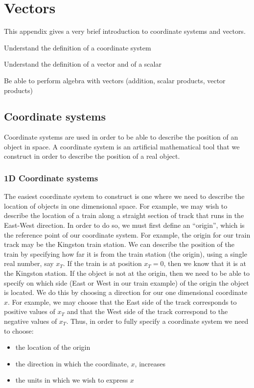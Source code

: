 \chapter{Vectors}
\label{app:vectors}
This appendix gives a very brief introduction to coordinate systems and vectors.
 \vspace{1cm}
\begin{learningObjectives}
\item Understand the definition of a coordinate system
\item Understand the definition of a vector and of a scalar
\item Be able to perform algebra with vectors (addition, scalar products, vector products)
\end{learningObjectives}

\section{Coordinate systems}
Coordinate systems are used in order to be able to describe the position of an object in space. A coordinate system is an artificial mathematical tool that we construct in order to describe the position of a real object. 

\subsection{1D Coordinate systems} 
The easiest coordinate system to construct is one where we need to describe the location of objects in one dimensional space. For example, we may wish to describe the location of a train along a straight section of track that runs in the East-West direction. In order to do so, we must first define an ``origin'', which is the reference point of our coordinate system. For example, the origin for our train track may be the Kingston train station. We can describe the position of the train by specifying how far it is from the train station (the origin), using a single real number, say $x_T$. If the train is at position $x_T=0$, then we know that it is at the Kingston station. If the object is not at the origin, then we need to be able to specify on which side (East or West in our train example) of the origin the object is located. We do this by choosing a direction for our one dimensional coordinate $x$. For example, we may choose that the East side of the track corresponds to positive values of $x_T$ and that the West side of the track correspond to the negative values of $x_T$. Thus, in order to fully specify a coordinate system we need to choose:
\begin{itemize}
\item the location of the origin
\item the direction in which the coordinate, $x$, increases
\item the units in which we wish to express $x$
\end{itemize} 

